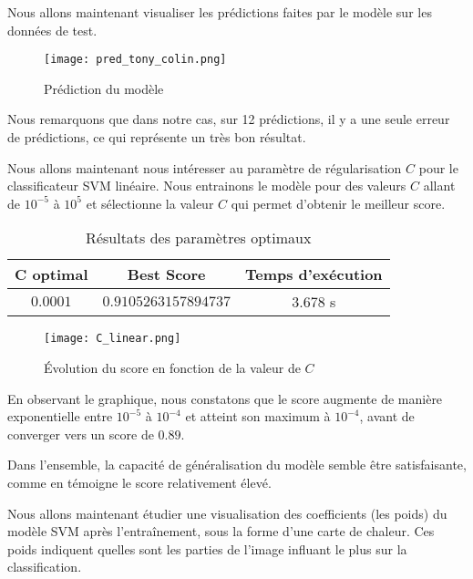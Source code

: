 \documentclass{article}
\begin{document}
Nous allons maintenant visualiser les prédictions faites par le modèle sur les données de test.


\begin{figure}[H]
    \centering
    \texttt{[image: pred\_tony\_colin.png]}
    \caption{Prédiction du modèle}
    \label{fig:enter-label}
\end{figure}

Nous remarquons que dans notre cas, sur 12 prédictions, il y a une seule erreur de prédictions, ce qui représente un très bon résultat.

Nous allons maintenant nous intéresser au paramètre de régularisation $C$ pour le classificateur SVM linéaire.
Nous entrainons le modèle pour des valeurs $C$ allant de $10^{-5}$ à $10^{5}$ et sélectionne la valeur $C$ qui permet d'obtenir le meilleur score.



\begin{table}[ht]
\centering
\begin{tabular}{|c|c|c|}
\hline
\textbf{C optimal} & \textbf{Best Score} & \textbf{Temps d'exécution} \\ \hline
$0.0001$           & $0.9105263157894737$ & $3.678$ s                   \\ \hline
\end{tabular}
\caption{Résultats des paramètres optimaux}
\end{table}




\begin{figure}[H]
    \centering
    \texttt{[image: C\_linear.png]}
    \caption{Évolution du score en fonction de la valeur de $C$}
    \label{fig:enter-label}
\end{figure}

En observant le graphique, nous constatons que le score augmente de manière exponentielle entre $10^{-5}$ à $10^{-4}$ et atteint son maximum à $10^{-4}$, avant de converger vers un score de $0.89$.

Dans l'ensemble, la capacité de généralisation du modèle semble être satisfaisante, comme en témoigne le score relativement élevé.

Nous allons maintenant étudier une visualisation des coefficients (les poids) du modèle SVM après l'entraînement, sous la forme d'une carte de chaleur. Ces poids indiquent quelles sont les parties de l'image influant le plus  sur la classification.
\end{document}
